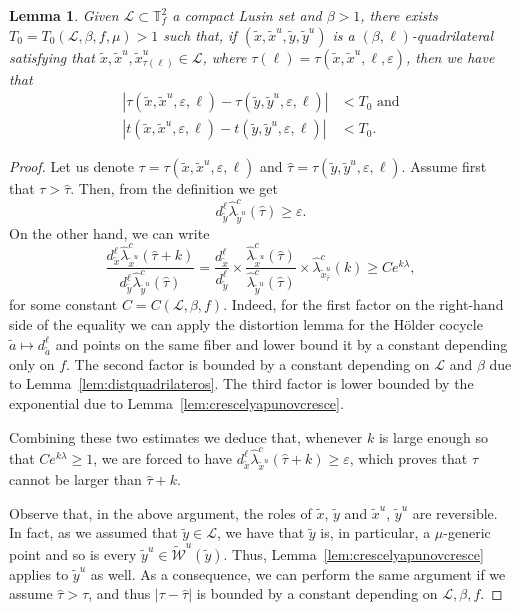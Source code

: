 \documentclass[a4paper,11pt,reqno]{amsart}
\newcommand{\TTf}{{\mathbb{T}_f^2}}
\newcommand{\cL}{{\mathcal L}}
\newcommand{\cW}{{\mathcal W}}
\newcommand{\eps}{\varepsilon}
\newcommand{\tix}{\tilde{x}}
\newcommand{\ta}{\tilde{a}}
\newcommand{\w}{\widetilde{\cW}}
\newtheorem{lemma}[theorem]{Lemma}
\theoremstyle{definition}
\begin{document}
\begin{lemma}
\label{lem:fatorizacao}
Given $\cL\subset\TTf$ a compact Lusin set and $\beta>1$, there exists $T_0=T_0(\cL,\beta,f,\mu)>1$ such that, if $(\tix,\tix^u,\tilde{y},\tilde{y}^u)$ is a $(\beta,\ell)$-quadrilateral satisfying that $\tix,\tix^u,\tix^u_{\tau(\ell)}\in\cL$, where $\tau(\ell)=\tau(\tix,\tix^u,\ell,\eps)$, then we have that 
\begin{align}
    \left|\tau(\tix,\tix^u,\eps,\ell)-\tau(\tilde{y},\tilde{y}^u,\eps,\ell)\right|&<T_0\nonumber \mbox{ and}\\
    \left|t(\tix,\tix^u,\eps,\ell)-t(\tilde{y},\tilde{y}^u,\eps,\ell)\right|&<T_0\nonumber.
\end{align}
\end{lemma}
\begin{proof}
Let us denote  $\tau=\tau(\tix,\tix^u,\eps,\ell)$ and $\hat{\tau}=\tau(\tilde{y},\tilde{y}^u,\eps,\ell)$. Assume first that $\tau>\hat{\tau}$. 
Then, from the definition we get
\[
d^\ell_{\tilde{y}}\hat{\lambda}^c_{\tilde{y}^u}(\hat{\tau})\geq\eps.
\]
On the other hand, we can write
$$
    \frac{d^\ell_{\tix}\hat{\lambda}^c_{\tix^u}(\hat{\tau}+k)}{d^\ell_{\tilde{y}}\hat{\lambda}^c_{\tilde{y}^u}(\hat{\tau})} =\frac{d^\ell_{\tix}}{d^\ell_{\tilde{y}}}\times\frac{\hat{\lambda}^c_{\tix^u}(\hat{\tau})}{\hat{\lambda}^c_{\tilde{y}^u}(\hat{\tau})}\times\hat{\lambda}^c_{\tix^u_{\hat{\tau}}}(k)\nonumber \geq Ce^{k\lambda}\nonumber,
$$
for some constant $C=C(\cL,\beta,f)$. Indeed, for the first factor on the right-hand side of the equality we can apply the distortion lemma for the Hölder cocycle $\ta\mapsto d^{\ell}_{\ta}$ and points on the same fiber and lower bound it by a constant depending only on $f$. The second factor is bounded by a constant depending on $\cL$ and $\beta$ due to Lemma~\ref{lem:distquadrilateros}. The third factor is lower bounded by the exponential due to Lemma~\ref{lem:crescelyapunovcresce}.  

Combining these two estimates we deduce that, whenever $k$ is large enough so that $Ce^{k\lambda}\geq 1$, we are forced to have ${d^\ell_{\tix}\hat{\lambda}^c_{\tix^u}(\hat{\tau}+k)}\geq\eps$, which proves that $\tau$ cannot be larger than $\hat{\tau}+k$.   

Observe that, in the above argument, the roles of $\tix$, $\tilde{y}$ and $\tix^u$, $\tilde{y}^u$
are reversible. In fact, as we assumed that $\tilde{y}\in\cL$, we have that $\tilde{y}$ is, in particular, a $\mu$-generic point and so is every $\tilde{y}^u\in\w^u(\tilde{y})$.  Thus, Lemma~\ref{lem:crescelyapunovcresce} applies to $\tilde{y}^u$ as well. As a consequence, we can perform the same argument if we assume $\hat{\tau}>\tau$, and thus $|\tau-\hat{\tau}|$ is bounded by a constant depending on $\cL,\beta,f$. 


\end{proof}
\end{document}
